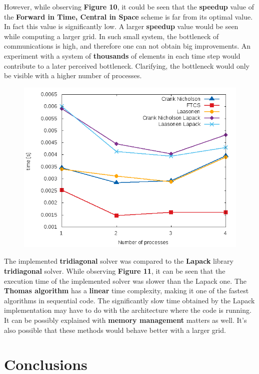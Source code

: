\documentclass[12pt]{article}
\begin{document}
\par However, while observing \textbf{Figure 10}, it could be seen that the \textbf{speedup} value of the \textbf{Forward in Time, Central in Space} scheme is far from its optimal value. In fact this value is significantly low. A larger \textbf{speedup} value would be seen while computing a larger grid. In such small system, the bottleneck of communications is high, and therefore one can not obtain big improvements. An experiment with a system of \textbf{thousands} of elements in each time step would contribute to a later perceived bottleneck. Clarifying, the bottleneck would only be visible with a higher number of processes.

\begin{figure}[!htb]
  \centering
  \includegraphics[width=.65\linewidth]{lapack_times.png}
\end{figure}

\par The implemented \textbf{tridiagonal} solver was compared to the \textbf{Lapack} library \textbf{tridiagonal} solver. While observing \textbf{Figure 11}, it can be seen that the execution time of the implemented solver was slower than the Lapack one. The \textbf{Thomas algorithm} has a \textbf{linear} time complexity, making it one of the fastest algorithms in sequential code. The significantly slow time obtained by the Lapack implementation may have to do with the architecture where the code is running. It can be possibly explained with \textbf{memory management} matters as well. It's also possible that these methods would behave better with a larger grid.

\pagebreak
\section*{Conclusions}
\end{document}
